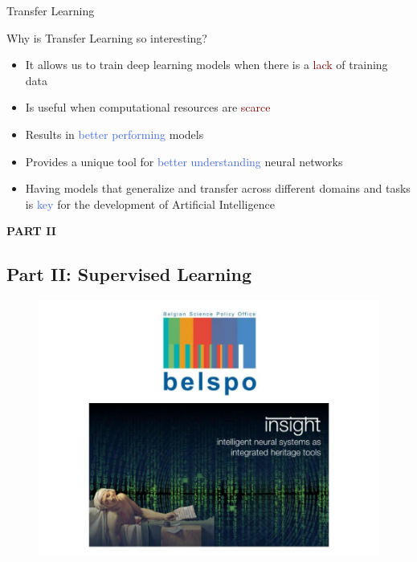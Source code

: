 \documentclass{beamer}
\begin{document}
\begin{frame}{Transfer Learning}

	Why is Transfer Learning so interesting?

	\begin{itemize}
		\item It allows us to train deep learning models when there is a \textcolor{Maroon}{lack} of training data
		\item Is useful when computational resources are \textcolor{Maroon}{scarce}
		\item Results in \textcolor{RoyalBlue}{better performing} models
		\item Provides a unique tool for \textcolor{RoyalBlue}{better understanding} neural networks  
		\item Having models that generalize and transfer across different domains and tasks is \textcolor{RoyalBlue}{key} for the development of Artificial Intelligence 
	\end{itemize}


\end{frame}



\begin{frame}
	\begin{center}
		\textcolor{skymagenta}{\textbf{PART II}}
	\end{center}
\end{frame}


\begin{frame}
	\section{Part II: Supervised Learning}
		\tableofcontents[sectionstyle=show/hide,subsectionstyle=show/show/hide]		
\end{frame}

\begin{frame}
	\begin{figure}
		\includegraphics[width=1\textwidth]{figures/insight}
	\end{figure}
\end{frame}
\end{document}
